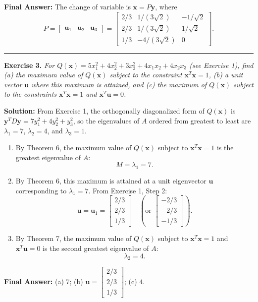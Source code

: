 \documentclass[11pt, letterpaper]{article}
\theoremstyle{definition}
\theoremstyle{remark}
\begin{document}
\textbf{Final Answer:} The change of variable is $\mathbf{x} = P\mathbf{y}$, where
\[
P = \begin{bmatrix} \mathbf{u}_1 & \mathbf{u}_2 & \mathbf{u}_3 \end{bmatrix} = \begin{bmatrix} 2/3 & 1/(3\sqrt{2}) & -1/\sqrt{2} \\ 2/3 & 1/(3\sqrt{2}) & 1/\sqrt{2} \\ 1/3 & -4/(3\sqrt{2}) & 0 \end{bmatrix}.
\]

\medskip
\hrule
\medskip

\textbf{Exercise 3.} \emph{For $Q(\mathbf{x}) = 5x_1^2 + 4x_2^2 + 3x_3^2 + 4x_1x_2 + 4x_2x_3$ (see Exercise 1), find (a) the maximum value of $Q(\mathbf{x})$ subject to the constraint $\mathbf{x}^T\mathbf{x} = 1$, (b) a unit vector $\mathbf{u}$ where this maximum is attained, and (c) the maximum of $Q(\mathbf{x})$ subject to the constraints $\mathbf{x}^T\mathbf{x} = 1$ and $\mathbf{x}^T\mathbf{u} = 0$.}

\textbf{Solution:}
From Exercise 1, the orthogonally diagonalized form of $Q(\mathbf{x})$ is $\mathbf{y}^T D \mathbf{y} = 7y_1^2 + 4y_2^2 + y_3^2$, so the eigenvalues of $A$ ordered from greatest to least are $\lambda_1 = 7$, $\lambda_2 = 4$, and $\lambda_3 = 1$.
\begin{enumerate}[label=(\alph*)]
    \item By Theorem 6, the maximum value of $Q(\mathbf{x})$ subject to $\mathbf{x}^T\mathbf{x} = 1$ is the greatest eigenvalue of $A$:
    \[
    M = \lambda_1 = 7.
    \]
    \item By Theorem 6, this maximum is attained at a unit eigenvector $\mathbf{u}$ corresponding to $\lambda_1 = 7$. From Exercise 1, Step 2:
    \[
    \mathbf{u} = \mathbf{u}_1 = \begin{bmatrix} 2/3 \\ 2/3 \\ 1/3 \end{bmatrix} \quad \left(\text{or } \begin{bmatrix} -2/3 \\ -2/3 \\ -1/3 \end{bmatrix}\right).
    \]
    \item By Theorem 7, the maximum value of $Q(\mathbf{x})$ subject to $\mathbf{x}^T\mathbf{x} = 1$ and $\mathbf{x}^T\mathbf{u} = 0$ is the second greatest eigenvalue of $A$:
    \[
    \lambda_2 = 4.
    \]
\end{enumerate}
\textbf{Final Answer:} (a) $7$; \quad (b) $\mathbf{u} = \begin{bmatrix} 2/3 \\ 2/3 \\ 1/3 \end{bmatrix}$; \quad (c) $4$.
\end{document}
